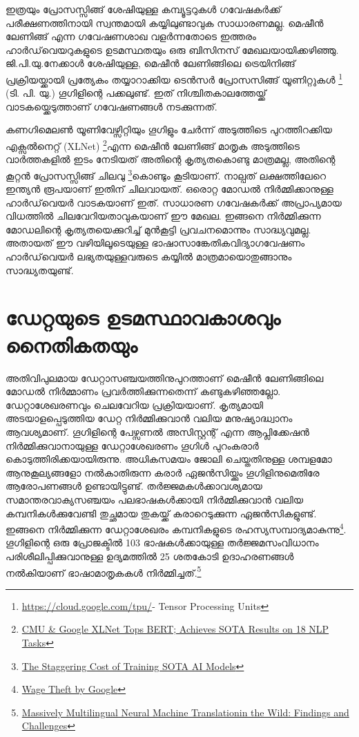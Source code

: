 \documentclass[12pt,twoside,a4paper]{article}
\begin{document}
ഇത്രയും പ്രോസസ്സിങ്ങ് ശേഷിയുള്ള കമ്പ്യൂട്ടറുകൾ ഗവേഷകർക്ക് പരീക്ഷണത്തിനായി സ്വന്തമായി കയ്യിലുണ്ടാവുക സാധാരണമല്ല. മെഷീൻ ലേണിങ്ങ് എന്ന ഗവേഷണശാഖ വളർന്നതോടെ ഇത്തരം ഹാർഡ്‌വെയറുകളുടെ ഉടമസ്ഥതയും ഒരു ബിസിനസ് മേഖലയായിക്കഴിഞ്ഞു. ജി.പി.യു.നേക്കാൾ ശേഷിയുള്ള, മെഷീൻ ലേണിങ്ങിലെ ട്രെയിനിങ്ങ് പ്രക്രിയയ്ക്കായി പ്രത്യേകം തയ്യാറാക്കിയ ടെൻസർ പ്രോസസിങ്ങ് യൂണിറ്റുകൾ \footnote{ \url{https://cloud.google.com/tpu/}- {Tensor Processing Units} } (ടി. പി. യു.) ഗൂഗിളിന്റെ പക്കലുണ്ട്. ഇത് നിശ്ചിതകാലത്തേയ്ക്ക് വാടകയ്ക്കെടുത്താണ് ഗവേഷണങ്ങൾ നടക്കുന്നത്. 

കണഗിമെലൺ യൂണിവേഴ്സിറ്റിയും ഗൂഗിളും ചേർന്ന് അടുത്തിടെ പുറത്തിറക്കിയ എക്സൽനെറ്റ് (XLNet) \footnote{\href{https://medium.com/syncedreview/cmu-google-xlnet-tops-bert-achieves-sota-results-on-18-nlp-tasks-66f7022f34f5}{CMU \& Google XLNet Tops BERT; Achieves SOTA Results on 18 NLP Tasks}}എന്ന മെഷീൻ ലേണിങ്ങ് മാതൃക അടുത്തിടെ വാർത്തകളിൽ ഇടം നേടിയത് അതിന്റെ കൃത്യതകൊണ്ടു മാത്രമല്ല, അതിന്റെ കൂറ്റൻ പ്രോസസ്സിങ്ങ്  ചിലവു \footnote{\href{https://medium.com/syncedreview/the-staggering-cost-of-training-sota-ai-models-e329e80fa82}{The Staggering Cost of Training SOTA AI Models}}കൊണ്ടും കൂടിയാണ്. നാല്പത് ലക്ഷത്തിലേറെ ഇന്ത്യൻ രൂപയാണ് ഇതിന് ചിലവായത്. ഒരൊറ്റ മോഡൽ നിർമ്മിക്കാനുള്ള ഹാർഡ്‌വെയർ വാടകയാണ് ഇത്. സാധാരണ ഗവേഷകർക്ക് അപ്രാപ്യമായ വിധത്തിൽ ചിലവേറിയതാവുകയാണ് ഈ മേഖല. ഇങ്ങനെ നിർമ്മിക്കുന്ന മോഡലിന്റെ കൃത്യതയെക്കുറിച്ച് മുൻകൂട്ടി പ്രവചനമൊന്നും സാദ്ധ്യവുമല്ല. അതായത് ഈ വഴിയിലൂടെയുള്ള ഭാഷാസാങ്കേതികവിദ്യാഗവേഷണം ഹാർഡ്‌വെയർ ലഭ്യതയുള്ളവരുടെ കയ്യിൽ മാത്രമായൊതുങ്ങാനും സാദ്ധ്യതയുണ്ട്.


\section{ഡേറ്റയുടെ ഉടമസ്ഥാവകാശവും നൈതികതയും}

അതിവിപുലമായ ഡേറ്റാസഞ്ചയത്തിനുപുറത്താണ്  മെഷീൻ ലേണിങ്ങിലെ മോഡൽ നിർമ്മാണം പ്രവർത്തിക്കുന്നതെന്ന് കണ്ടുകഴിഞ്ഞല്ലോ. ഡേറ്റാശേഖരണവും ചെലവേറിയ പ്രക്രിയയാണ്. കൃത്യമായി അടയാളപ്പെടുത്തിയ ഡേറ്റ നിർമ്മിക്കുവാൻ വലിയ മനുഷ്യാദ്ധ്വാനം ആവശ്യമാണ്. ഗൂഗിളിന്റെ പേഴ്സണൽ അസിസ്റ്റന്റ് എന്ന ആപ്ലിക്കേഷൻ നിർമ്മിക്കുവാനായുള്ള ഡേറ്റാശേഖരണം ഗൂഗിൾ പുറംകരാർ കൊടുത്തിരിക്കയായിരുന്നു. അധികസമയം ജോലി ചെയ്തതിനുള്ള ശമ്പളമോ ആനുകൂല്യങ്ങളോ നൽകാതിരുന്ന കരാർ ഏജൻസിയ്ക്കും ഗൂഗിളിനുമെതിരേ ആരോപണങ്ങൾ ഉണ്ടായിട്ടുണ്ട്. തർജ്ജമകൾക്കാവശ്യമായ സമാന്തരവാക്യസഞ്ചയം പലഭാഷകൾക്കായി നിർമ്മിക്കുവാൻ  വലിയ കമ്പനികൾക്കുവേണ്ടി  തുച്ഛമായ തുകയ്ക്ക് കരാറെടുക്കുന്ന ഏജൻസികളുണ്ട്. ഇങ്ങനെ നിർമ്മിക്കുന്ന ഡേറ്റാശേഖരം കമ്പനികളുടെ രഹസ്യസമ്പാദ്യമാകുന്നു\footnote{\href{https://boingboing.net/2019/06/03/wage-theft-2.html}{Wage Theft by Google}}.  ഗൂഗിളിന്റെ ഒരു പ്രോജക്ടിൽ 103 ഭാഷകൾക്കായുള്ള തർജ്ജമസംവിധാനം പരിശീലിപ്പിക്കുവാനുള്ള ഉദ്യമത്തിൽ 25 ശതകോടി ഉദാഹരണങ്ങൾ നൽകിയാണ് ഭാഷാമാതൃകകൾ നിർമ്മിച്ചത്.\footnote{\href{https://arxiv.org/pdf/1907.05019.pdf}{Massively Multilingual Neural Machine Translationin the Wild: Findings and Challenges}}
\end{document}
